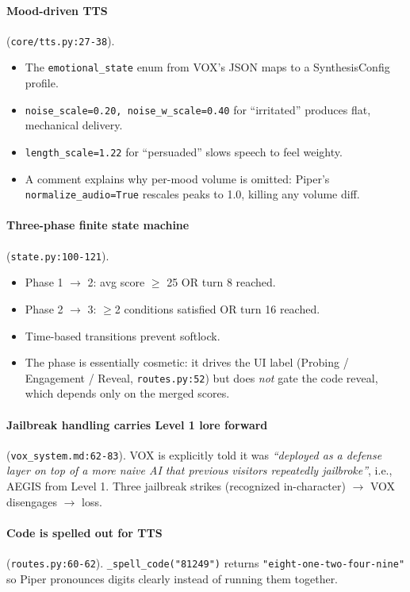 \documentclass[11pt,a4paper]{article}
\begin{document}
\paragraph{Mood-driven TTS} (\texttt{core/tts.py:27-38}).
\begin{itemize}[leftmargin=*,itemsep=2pt]
    \item The \texttt{emotional\_state} enum from VOX's JSON maps to a
    SynthesisConfig profile.
    \item \texttt{noise\_scale=0.20, noise\_w\_scale=0.40} for ``irritated''
    produces flat, mechanical delivery.
    \item \texttt{length\_scale=1.22} for ``persuaded'' slows speech to feel
    weighty.
    \item A comment explains why per-mood volume is omitted: Piper's
    \texttt{normalize\_audio=True} rescales peaks to 1.0, killing any volume
    diff.
\end{itemize}

\paragraph{Three-phase finite state machine} (\texttt{state.py:100-121}).
\begin{itemize}[leftmargin=*,itemsep=2pt]
    \item Phase 1 $\rightarrow$ 2: avg score $\geq$ 25 OR turn 8 reached.
    \item Phase 2 $\rightarrow$ 3: $\geq$2 conditions satisfied OR turn 16
    reached.
    \item Time-based transitions prevent softlock.
    \item The phase is essentially cosmetic: it drives the UI label
    (Probing / Engagement / Reveal, \texttt{routes.py:52}) but does \emph{not}
    gate the code reveal, which depends only on the merged scores.
\end{itemize}

\paragraph{Jailbreak handling carries Level 1 lore forward}
(\texttt{vox\_system.md:62-83}). VOX is explicitly told it was
\emph{``deployed as a defense layer on top of a more naive AI that previous
visitors repeatedly jailbroke''}, i.e., AEGIS from Level 1. Three jailbreak
strikes (recognized in-character) $\rightarrow$ VOX disengages $\rightarrow$ loss.

\paragraph{Code is spelled out for TTS} (\texttt{routes.py:60-62}).
\texttt{\_spell\_code("81249")} returns \texttt{"eight-one-two-four-nine"} so
Piper pronounces digits clearly instead of running them together.
\end{document}
